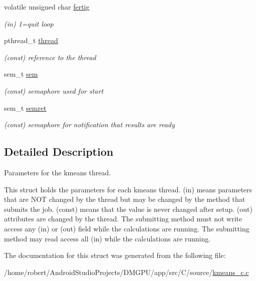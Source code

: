 \begin{DoxyCompactItemize}
\mbox{\label{structkmeans__pt_ad2580bc7fb5eac708522af779db2d54c}} 
volatile unsigned char \mbox{\hyperlink{structkmeans__pt_ad2580bc7fb5eac708522af779db2d54c}{fertig}}
\begin{DoxyCompactList}\small\item\em (in) 1=quit loop \end{DoxyCompactList}\item 
\mbox{\label{structkmeans__pt_a2648d7c598e20fdf23e9d30f43b4b17c}} 
pthread\+\_\+t \mbox{\hyperlink{structkmeans__pt_a2648d7c598e20fdf23e9d30f43b4b17c}{thread}}
\begin{DoxyCompactList}\small\item\em (const) reference to the thread \end{DoxyCompactList}\item 
\mbox{\label{structkmeans__pt_af1c42a889c6180d899cb41066d2884c0}} 
sem\+\_\+t \mbox{\hyperlink{structkmeans__pt_af1c42a889c6180d899cb41066d2884c0}{sem}}
\begin{DoxyCompactList}\small\item\em (const) semaphore used for start \end{DoxyCompactList}\item 
\mbox{\label{structkmeans__pt_aa959612fc7e6fa42798130bbf1c437a7}} 
sem\+\_\+t \mbox{\hyperlink{structkmeans__pt_aa959612fc7e6fa42798130bbf1c437a7}{semret}}
\begin{DoxyCompactList}\small\item\em (const) semaphore for notification that results are ready \end{DoxyCompactList}\end{DoxyCompactItemize}


\subsection{Detailed Description}
Parameters for the kmeans thread. 

This struct holds the parameters for each kmeans thread. (in) means parameters that are N\+OT changed by the thread but may be changed by the method that submits the job. (const) means that the value is never changed after setup. (out) attributes are changed by the thread. The submitting method must not write access any (in) or (out) field while the calculations are running. The submitting method may read access all (in) while the calculations are running. 

The documentation for this struct was generated from the following file\+:\begin{DoxyCompactItemize}
\item 
/home/robert/\+Android\+Studio\+Projects/\+D\+M\+G\+P\+U/app/src/\+C/source/\mbox{\hyperlink{kmeans__c_8c}{kmeans\+\_\+c.\+c}}\end{DoxyCompactItemize}
